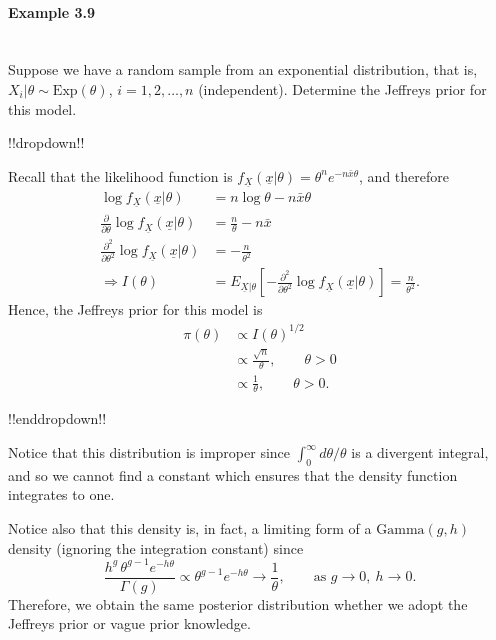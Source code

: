 \paragraph{Example 3.9}{~\\
Suppose we have a random sample from an exponential distribution, that  is, $X_i|\theta\sim \mathrm{Exp}(\theta)$, $i=1,2,\ldots,n$ (independent). Determine the Jeffreys prior for this model.

!!dropdown!!

Recall that the likelihood function is
    $f_{\underline{X}}(\underline{x}|\theta)=\theta^n e^{-n\bar x\theta}$,
    and therefore 
    \begin{align*}
    \log f_{\underline{X}}(\underline{x}|\theta) &=n\log\theta -n\bar x\theta \\
    \frac{\partial}{\partial\theta} \log
    f_{\underline{X}}(\underline{x}|\theta) &=\frac{n}{\theta}-n\bar x \\
    \frac{\partial^2}{\partial\theta^2} \log
    f_{\underline{X}}(\underline{x}|\theta)&=-\frac{n}{\theta^2} \\ 
    \Rightarrow I(\theta) &=E_{\underline{X}|\theta}
    \left[-\frac{\partial^2}{\partial\theta^2} \log
    f_{\underline{X}}(\underline{x}|\theta)\right]=\frac{n}{\theta^2}.
    \end{align*}
    Hence, the Jeffreys prior for this model is
    \begin{align*}
    \pi(\theta)&\propto I(\theta)^{1/2} \\
    &\propto \frac{\sqrt{n}}{\theta},\quad\quad\theta>0 \\
    &\propto \frac{1}{\theta},\quad\quad\theta>0.
    \end{align*}

!!enddropdown!!

Notice that this distribution is improper since $\int_0^\infty d\theta/\theta$ is a divergent integral, and so we cannot find a constant which ensures that the density function integrates to one.

Notice also that this density is, in fact, a limiting form of a $\mathrm{Gamma}(g,h)$ density (ignoring the integration constant) since
\begin{equation*}
\frac{h^g\,\theta^{g-1}e^{-h\theta}}{\Gamma(g)}\propto
\theta^{g-1}e^{-h\theta} 
\to \frac{1}{\theta},\quad\quad\text{as }g\to 0,~h\to 0.
\end{equation*}
Therefore, we obtain the same posterior distribution whether we adopt the Jeffreys prior or vague prior knowledge.}

